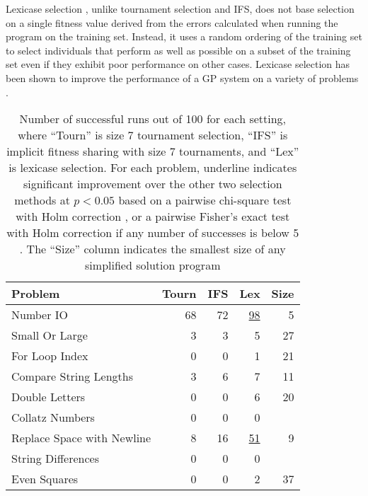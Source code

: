 \documentclass{sig-alternate}
\begin{document}
Lexicase selection \cite{Helmuth:2014:ieeeTEC}, %
 unlike tournament selection and IFS, does not base selection on a single fitness value derived from the errors calculated when running the program on the training set. Instead, it uses a random ordering of the training set to select individuals that perform as well as possible on a subset of the training set even if they exhibit poor performance on other cases. Lexicase selection has been shown to improve the performance of a GP system on a variety of problems \cite{Helmuth:2014:ieeeTEC, Helmuth:2014:GECCO}.

\begin{table}[t]
\centering
\caption{Number of successful runs out of 100 for each setting, where ``Tourn'' is size 7 tournament selection, ``IFS'' is implicit fitness sharing with size 7 tournaments, and ``Lex'' is lexicase selection. For each problem, underline indicates significant improvement over the other two selection methods at $p < 0.05$ based on a pairwise chi-square test with Holm correction \cite{R}, or a pairwise Fisher's exact test with Holm correction if any number of successes is below 5 \cite{fmsb}. The ``Size'' column indicates the smallest size of any simplified solution program}
\label{tableResults}
\begin{tabular}{lrrr|r}
\toprule
Problem                    & Tourn & IFS & Lex & Size \\
\midrule
Number IO                  & 68      & 72  & \underline{98}       & 5    \\
Small Or Large             & 3       & 3   & 5        & 27   \\
For Loop Index             & 0       & 0   & 1        & 21   \\
Compare String Lengths     & 3       & 6   & 7        & 11   \\
Double Letters             & 0       & 0   & 6        & 20   \\
Collatz Numbers            & 0       & 0   & 0        &     \\
Replace Space with Newline & 8       & 16  & \underline{51}       & 9    \\
String Differences         & 0       & 0   & 0        &     \\
Even Squares               & 0       & 0   & 2        & 37   \\

\end{tabular}
\end{table}
\end{document}
